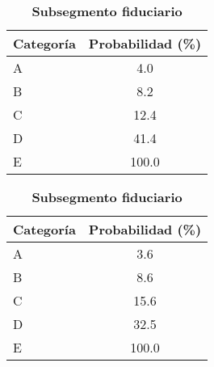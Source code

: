 \begin{table}[H]
\begin{subtable}[t]{0.32\textwidth}
\centering
\begin{tabular}{@{}lc@{}}
\toprule
\textbf{Categoría} & \textbf{Probabilidad (\%)} \\
\midrule
A & 4.0 \\
B & 8.2 \\
C & 12.4 \\
D & 41.4 \\
E & 100.0 \\
\bottomrule
\end{tabular}
\caption{\textbf{Subsegmento de vehículos}}
\end{subtable}
\hfill
\begin{subtable}[t]{0.32\textwidth}
\centering
\begin{tabular}{@{}lc@{}}
\toprule
\textbf{Categoría} & \textbf{Probabilidad (\%)} \\
\midrule
A & 3.6 \\
B & 8.6 \\
C & 15.6 \\
D & 32.5 \\
E & 100.0 \\
\bottomrule
\end{tabular}
\caption{\textbf{Subsegmento fiduciario}}
\end{subtable}
\hfill
\end{table}